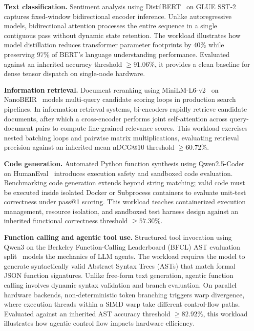 \documentclass[10pt,twocolumn]{article}
\begin{document}
\textbf{Text classification.} Sentiment analysis using DistilBERT~\citep{sanh2019distilbert} on GLUE SST-2~\citep{socher2013sst2} captures fixed-window bidirectional encoder inference. Unlike autoregressive models, bidirectional attention processes the entire sequence in a single contiguous pass without dynamic state retention. The workload illustrates how model distillation reduces transformer parameter footprints by $40\%$ while preserving $97\%$ of BERT's language understanding performance. Evaluated against an inherited accuracy threshold $\ge 91.06\%$, it provides a clean baseline for dense tensor dispatch on single-node hardware.

\textbf{Information retrieval.} Document reranking using MiniLM-L6-v2~\citep{reimers2019sbert} on NanoBEIR~\citep{thakur2021beir} models multi-query candidate scoring loops in production search pipelines. In information retrieval systems, bi-encoders rapidly retrieve candidate documents, after which a cross-encoder performs joint self-attention across query-document pairs to compute fine-grained relevance scores. This workload exercises nested batching loops and pairwise matrix multiplications, evaluating retrieval precision against an inherited mean nDCG@10 threshold $\ge 60.72\%$.

\textbf{Code generation.} Automated Python function synthesis using Qwen2.5-Coder~\citep{yang2024qwen25} on HumanEval~\citep{chen2021humaneval} introduces execution safety and sandboxed code evaluation. Benchmarking code generation extends beyond string matching; valid code must be executed inside isolated Docker or Subprocess containers to evaluate unit-test correctness under pass@1 scoring. This workload teaches containerized execution management, resource isolation, and sandboxed test harness design against an inherited functional correctness threshold $\ge 57.30\%$.

\textbf{Function calling and agentic tool use.} Structured tool invocation using Qwen3 on the Berkeley Function-Calling Leaderboard (BFCL) AST evaluation split~\citep{yan2024bfcl} models the mechanics of LLM agents. The workload requires the model to generate syntactically valid Abstract Syntax Trees (ASTs) that match formal JSON function signatures. Unlike free-form text generation, agentic function calling involves dynamic syntax validation and branch evaluation. On parallel hardware backends, non-deterministic token branching triggers warp divergence, where execution threads within a SIMD warp take different control-flow paths. Evaluated against an inherited AST accuracy threshold $\ge 82.92\%$, this workload illustrates how agentic control flow impacts hardware efficiency.
\end{document}
